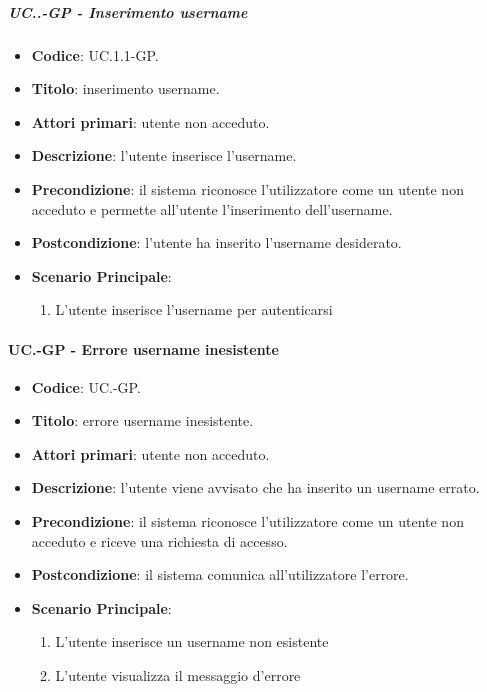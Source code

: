 		\subparagraph{UC\theuccount.\thesubuccount.\thesubsubuccount-GP - Inserimento username}
			\begin{itemize}
				\item \textbf{Codice}: UC\theuccount.1.1-GP.
				\item \textbf{Titolo}: inserimento username.
				\item \textbf{Attori primari}: utente non acceduto.
				\item \textbf{Descrizione}: l'utente inserisce l'username.
				\item \textbf{Precondizione}: il sistema riconosce l'utilizzatore come un utente non acceduto e permette all'utente l'inserimento dell'username.
				\item \textbf{Postcondizione}: l'utente ha inserito l'username desiderato.
				\item \textbf{Scenario Principale}:
				\begin{enumerate}
					\item L'utente inserisce l'username per autenticarsi
				\end{enumerate}
			\end{itemize}
	
	\paragraph{UC\theuccount.\thesubuccount-GP - Errore username inesistente}
		\begin{itemize}
			\item \textbf{Codice}: UC\theuccount.\thesubuccount-GP.
			\item \textbf{Titolo}: errore username inesistente.
			\item \textbf{Attori primari}: utente non acceduto.
			\item \textbf{Descrizione}: l'utente viene avvisato che ha inserito un username errato.
			\item \textbf{Precondizione}: il sistema riconosce l'utilizzatore come un utente non acceduto e riceve una richiesta di accesso. 
			\item \textbf{Postcondizione}: il sistema comunica all'utilizzatore l'errore.
			\item \textbf{Scenario Principale}:
			\begin{enumerate}
				\item L'utente inserisce un username non esistente
				\item L'utente visualizza il messaggio d'errore
			\end{enumerate}
		\end{itemize}
